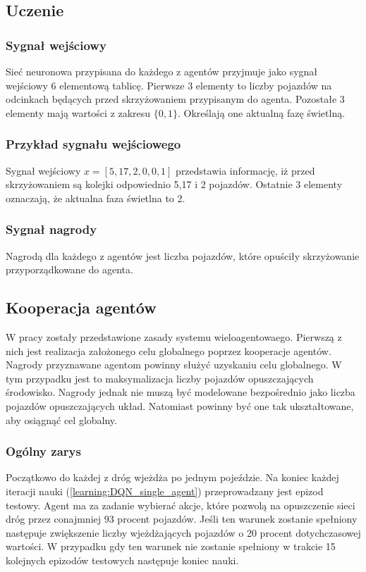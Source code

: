 \documentclass[12pt]{book}
\theoremstyle{plain}
\newcommand{\myref}[1]{(\ref{#1})}
\begin{document}
\subsection{Uczenie}
\subsubsection*{Sygnał wejściowy}
Sieć neuronowa przypisana do każdego z agentów przyjmuje jako sygnał wejściowy 6 elementową tablicę. Pierwsze 3 elementy to liczby pojazdów na odcinkach będących przed skrzyżowaniem przypisanym do agenta. Pozostałe 3 elementy mają wartości z zakresu $\{0,1\}$. Określają one aktualną fazę świetlną. 
\subsubsection*{Przykład sygnału wejściowego}
Sygnał wejściowy $x=[5,17,2,0,0,1]$ przedstawia informację, iż przed skrzyżowaniem są kolejki odpowiednio 5,17 i 2 pojazdów. Ostatnie 3 elementy oznaczają, że aktualna faza świetlna to 2.
\subsubsection*{Sygnał nagrody}
Nagrodą dla każdego z agentów jest liczba pojazdów, które opuściły skrzyżowanie przyporządkowane do agenta.
\subsection*{Kooperacja agentów}
W pracy \cite{wang2018cooperative} zostały przedstawione zasady systemu wieloagentowaego. Pierwszą z nich jest realizacja założonego celu globalnego poprzez kooperacje agentów. Nagrody przyznawane agentom powinny służyć uzyskaniu celu globalnego. W tym przypadku jest to maksymalizacja liczby pojazdów opuszczających środowisko. Nagrody jednak nie muszą być modelowane bezpośrednio jako liczba pojazdów opuszczających układ. Natomiast powinny być one tak ukształtowane, aby osiągnąć cel globalny. 
\subsubsection{Ogólny zarys}
Początkowo do każdej z dróg wjeżdża po jednym pojeździe. Na koniec każdej iteracji nauki \myref{learning:DQN_single_agent} przeprowadzany jest epizod testowy. Agent ma za zadanie wybierać akcje, które pozwolą na opuszczenie sieci dróg przez conajmniej 93 procent pojazdów. Jeśli ten warunek zostanie spełniony następuje zwiększenie liczby wjeżdżających pojazdów o 20 procent dotychczasowej wartości. W przypadku gdy ten warunek nie zostanie spełniony w trakcie 15 kolejnych epizodów testowych następuje koniec nauki. 
\end{document}
